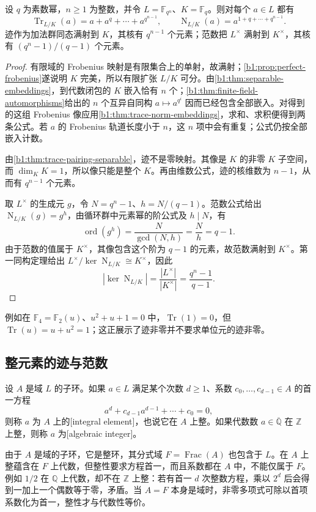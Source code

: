 \begin{proposition}\label{b1:prop:finite-field-trace-norm}
	设 \(q\) 为素数幂，\(n\geq1\) 为整数，并令 \(L=\mathbb F_{q^n}\)、\(K=\mathbb F_q\)。则对每个 \(a\in L\) 都有
	\[
		\operatorname{Tr}_{L/K}(a)=a+a^q+\cdots+a^{q^{n-1}},\qquad \operatorname{N}_{L/K}(a)=a^{1+q+\cdots+q^{n-1}}.
	\]
	迹作为加法群同态满射到 \(K\)，其核有 \(q^{n-1}\) 个元素；范数把 \(L^\times\) 满射到 \(K^\times\)，其核有 \((q^n-1)/(q-1)\) 个元素。
\end{proposition}
\begin{proof}
	有限域的 Frobenius 映射是有限集合上的单射，故满射；\cref{b1:prop:perfect-frobenius}遂说明 \(K\) 完美，所以有限扩张 \(L/K\) 可分。由\cref{b1:thm:separable-embeddings}，到代数闭包的 \(K\) 嵌入恰有 \(n\) 个；\cref{b1:thm:finite-field-automorphisms}给出的 \(n\) 个互异自同构 \(a\mapsto a^{q^i}\) 因而已经包含全部嵌入。对得到的这组 Frobenius 像应用\cref{b1:thm:trace-norm-embeddings}，求和、求积便得到两条公式。若 \(a\) 的 Frobenius 轨道长度小于 \(n\)，这 \(n\) 项中会有重复；公式仍按全部嵌入计数。

	由\cref{b1:thm:trace-pairing-separable}，迹不是零映射。其像是 \(K\) 的非零 \(K\) 子空间，而 \(\dim_K K=1\)，所以像只能是整个 \(K\)。再由维数公式，迹的核维数为 \(n-1\)，从而有 \(q^{n-1}\) 个元素。

	取 \(L^\times\) 的生成元 \(g\)，令 \(N=q^n-1\)、\(h=N/(q-1)\)。范数公式给出 \(\operatorname{N}_{L/K}(g)=g^h\)，由循环群中元素幂的阶公式及 \(h\mid N\)，有
	\[
		\operatorname{ord}(g^h) =\frac{N}{\gcd(N,h)} =\frac Nh =q-1.
	\]
	由于范数的值属于 \(K^\times\)，其像包含这个阶为 \(q-1\) 的元素，故范数满射到 \(K^\times\)。第一同构定理给出 \(L^\times/\ker\operatorname{N}_{L/K}\cong K^\times\)，因此
	\[
		|\ker\operatorname{N}_{L/K}| =\frac{|L^\times|}{|K^\times|} =\frac{q^n-1}{q-1}.
	\]
\end{proof}
例如在 \(\mathbb F_4=\mathbb F_2(u)\)、\(u^2+u+1=0\) 中，\(\operatorname{Tr}(1)=0\)，但 \(\operatorname{Tr}(u)=u+u^2=1\)；这正展示了迹非零并不要求单位元的迹非零。

\subsection{整元素的迹与范数}
\label{b1:subsec:1804:02}

\begin{definition}\label{b1:def:integral-element-field}
	设 \(A\) 是域 \(L\) 的子环。如果 \(a\in L\) 满足某个次数 \(d\geq1\)、系数 \(c_0,\ldots,c_{d-1}\in A\) 的首一方程
	\[
		a^d+c_{d-1}a^{d-1}+\cdots+c_0=0,
	\]
	则称 \(a\) 为 \(A\) 上的[integral element]，也说它在 \(A\) 上整。如果代数数 \(a\in\overline{\mathbb Q}\) 在 \(\mathbb Z\) 上整，则称 \(a\) 为[algebraic integer]。
\end{definition}
由于 \(A\) 是域的子环，它是整环，其分式域 \(F=\operatorname{Frac}(A)\) 也包含于 \(L\)。在 \(A\) 上整蕴含在 \(F\) 上代数，但整性要求方程首一，而且系数都在 \(A\) 中，不能仅属于 \(F\)。例如 \(1/2\) 在 \(\mathbb Q\) 上代数，却不在 \(\mathbb Z\) 上整：若有首一 \(d\) 次整数方程，乘以 \(2^d\) 后会得到一加上一个偶数等于零，矛盾。当 \(A=F\) 本身是域时，非零多项式可除以首项系数化为首一，整性才与代数性等价。

